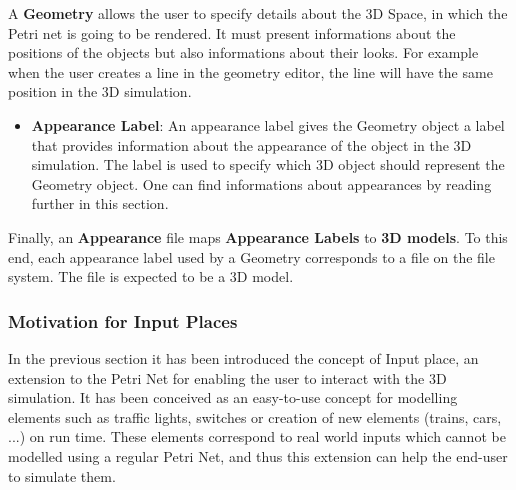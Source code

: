 A \textbf{Geometry} allows the user to specify details about the 3D Space, in which the Petri net is going to be rendered. It must present informations about the positions of the objects but also informations about their looks. For example when the user creates a line in the geometry editor, the line will have the same position in the 3D simulation.

\begin{itemize}
  \item \textbf{Appearance Label}: An appearance label gives the Geometry object a label that provides information about the appearance of the object in the 3D simulation. The label is used to specify which 3D object should represent the Geometry object. One can find informations about appearances by reading further in this section.
\end{itemize}

Finally, an \textbf{Appearance} file maps \textbf{Appearance Labels} to \textbf{3D models}.
To this end, each appearance label used by a Geometry corresponds to a file on the file system. The file is expected to be a 3D model.

\subsubsection{Motivation for Input Places}

In the previous section it has been introduced the concept of Input place, an extension to the Petri Net for enabling the user to interact with the 3D simulation. It has been conceived as an easy-to-use concept for modelling elements such as traffic lights, switches or creation of new elements (trains, cars, ...) on run time. These elements correspond to real world inputs which cannot be modelled using a regular Petri Net, and thus this extension can help the end-user to simulate them.

\newpage
